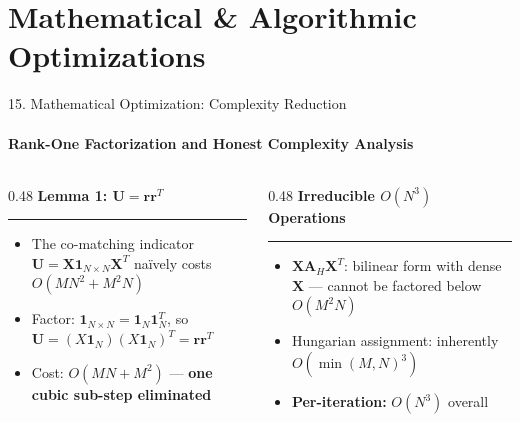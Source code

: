 \documentclass[aspectratio=169, 11pt]{beamer}
\begin{document}
\section{Mathematical \& Algorithmic Optimizations}
\begin{frame}{15. Mathematical Optimization: Complexity Reduction}
\framesubtitle{Rank-One Factorization and Honest Complexity Analysis}

\begin{columns}[T]
    \begin{column}{0.48\textwidth}
        \textbf{Lemma 1: $\mathbf{U} = \mathbf{r}\mathbf{r}^T$}
        \vspace{0.3em}
        \hrule
        \vspace{0.4em}
        \small
        \begin{itemize}
            \setlength\itemsep{0.4em}
            \item The co-matching indicator $\mathbf{U} = \mathbf{X}\mathbf{1}_{N\times N}\mathbf{X}^T$ na\"ively costs $O(MN^2{+}M^2N)$
            \item Factor: $\mathbf{1}_{N\times N} = \mathbf{1}_N\mathbf{1}_N^T$, so $\mathbf{U} = (X\mathbf{1}_N)(X\mathbf{1}_N)^T = \mathbf{r}\mathbf{r}^T$
            \item Cost: $O(MN + M^2)$ --- \textcolor{green!60!black}{\textbf{one cubic sub-step eliminated}}
        \end{itemize}
    \end{column}

    \hfill\vrule\hfill

    \begin{column}{0.48\textwidth}
        \textbf{Irreducible $O(N^3)$ Operations}
        \vspace{0.3em}
        \hrule
        \vspace{0.4em}
        \small
        \begin{itemize}
            \setlength\itemsep{0.4em}
            \item $\mathbf{X}\mathbf{A}_H\mathbf{X}^T$: bilinear form with dense $\mathbf{X}$ --- cannot be factored below $O(M^2N)$
            \item Hungarian assignment: inherently $O(\min(M,N)^3)$
            \item \textbf{Per-iteration:} $O(N^3)$ overall
        \end{itemize}
    \end{column}
\end{columns}


\end{frame}
\end{document}

